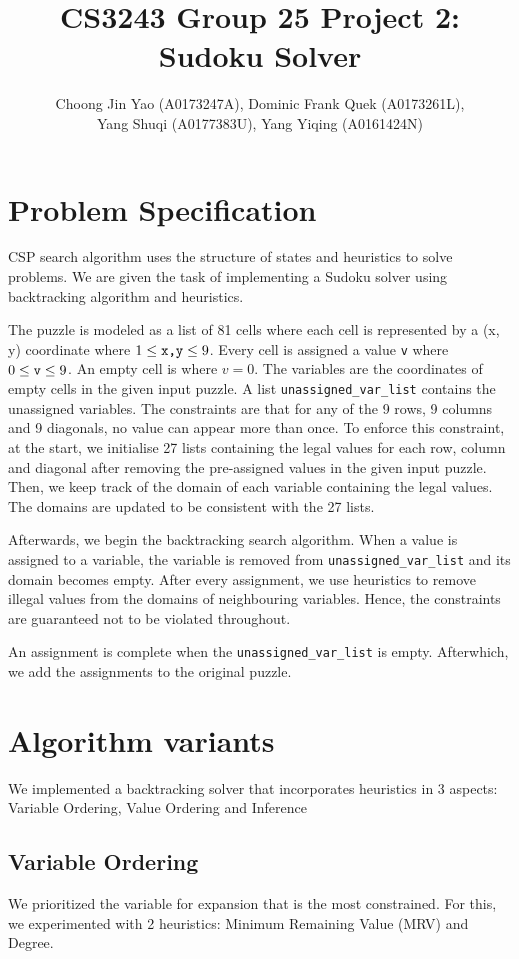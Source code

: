 \documentclass[runningheads]{llncs}
\title{CS3243 Group 25 Project 2: Sudoku Solver}
\author{Choong Jin Yao (A0173247A), Dominic Frank Quek (A0173261L),\\ Yang Shuqi (A0177383U), Yang Yiqing (A0161424N)}
\institute{National University of Singapore}
\begin{document}
\maketitle

\section{Problem Specification}
CSP search algorithm uses the structure of states and heuristics to solve problems. We are given the task of implementing a Sudoku solver using backtracking algorithm and heuristics. 

The puzzle is modeled as a list of 81 cells where each cell is represented by a (x, y) coordinate where $ 1\leq \verb`x,y` \leq 9$. Every cell is assigned a value \verb`v` where  $ 0\leq \verb`v` \leq 9$. An empty cell is where $v = 0$. The variables are the coordinates of empty cells in the given input puzzle. A list \verb`unassigned_var_list` contains the unassigned variables. The constraints are that for any of the 9 rows, 9 columns and 9 diagonals, no value can appear more than once. To enforce this constraint, at the start, we initialise 27 lists containing the legal values for each row, column and diagonal after removing the pre-assigned values in the given input puzzle. Then, we keep track of the domain of each variable containing the legal values. The domains are updated to be consistent with the 27 lists. 

Afterwards, we begin the backtracking search algorithm. When a value is assigned to a variable, the variable is removed from \verb`unassigned_var_list` and its domain becomes empty. After every assignment, we use heuristics to remove illegal values from the domains of neighbouring variables. Hence, the constraints are guaranteed not to be violated throughout.

An assignment is complete when the  \verb`unassigned_var_list` is empty. Afterwhich, we add the assignments to the original puzzle.

\section{Algorithm variants}
We implemented a backtracking solver that incorporates heuristics in 3 aspects: Variable Ordering, Value Ordering and Inference

\subsection{Variable Ordering}
We prioritized the variable for expansion that is the most constrained. For this, we experimented with 2 heuristics: Minimum Remaining Value (MRV) and Degree.
\end{document}
